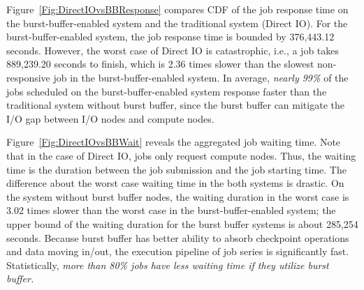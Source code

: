 
Figure~\ref{Fig:DirectIOvsBBResponse} compares CDF of the job response
time on the burst-buffer-enabled system and the traditional system (Direct IO).
For the burst-buffer-enabled system, the job response time is bounded by 376,443.12 seconds.
However, the worst case of Direct IO is catastrophic, i.e., a job takes 889,239.20 seconds to finish, which is 2.36 times slower than the slowest non-responsive job
in the burst-buffer-enabled system.
In average, \textit{nearly 99\%} of the jobs scheduled on the burst-buffer-enabled system
response faster than the traditional system without burst buffer, since the burst buffer can mitigate the I/O gap between I/O nodes and compute nodes.



Figure~\ref{Fig:DirectIOvsBBWait} reveals the aggregated job waiting time.
Note that in the case of Direct IO, jobs only request compute nodes.
Thus, the waiting time is the duration between the job submission and the job starting time.
The difference about the worst case waiting time in the both systems is drastic.
On the system without burst buffer nodes, the waiting duration in the worst case is 3.02 times
slower than the worst case in the burst-buffer-enabled system;
the upper bound of the waiting duration for the burst buffer systems is about 285,254 seconds.
Because burst buffer has better ability to absorb checkpoint operations and data moving in/out,
the execution pipeline of job series is significantly fast.
Statistically, \textit{more than 80\% jobs have less waiting time if they utilize burst buffer.}

